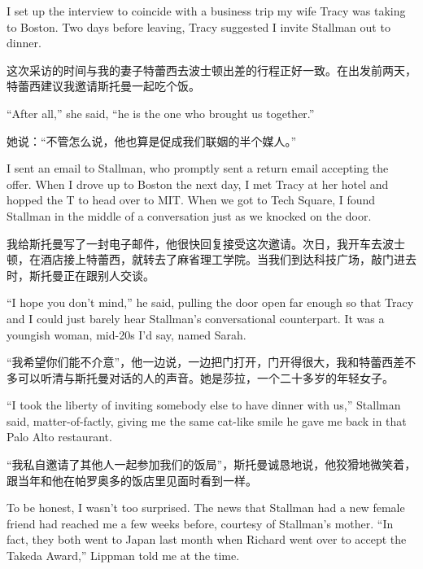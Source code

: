 \ifdefined\eng
I set up the interview to coincide with a business trip my wife Tracy was taking to Boston. Two days before leaving, Tracy suggested I invite Stallman out to dinner.
\fi

\ifdefined\chs
这次采访的时间与我的妻子特蕾西去波士顿出差的行程正好一致。在出发前两天，特蕾西建议我邀请斯托曼一起吃个饭。
\fi

\ifdefined\eng
``After all,'' she said, ``he is the one who brought us together.''
\fi

\ifdefined\chs
她说：``不管怎么说，他也算是促成我们联姻的半个媒人。''
\fi

\ifdefined\eng
I sent an email to Stallman, who promptly sent a return email accepting the offer. When I drove up to Boston the next day, I met Tracy at her hotel and hopped the T to head over to MIT. When we got to Tech Square, I found Stallman in the middle of a conversation just as we knocked on the door.
\fi

\ifdefined\chs
我给斯托曼写了一封电子邮件，他很快回复接受这次邀请。次日，我开车去波士顿，在酒店接上特蕾西，就转去了麻省理工学院。当我们到达科技广场，敲门进去时，斯托曼正在跟别人交谈。
\fi

\ifdefined\eng
``I hope you don't mind,'' he said, pulling the door open far enough so that Tracy and I could just barely hear Stallman's conversational counterpart. It was a youngish woman, mid-20s I'd say, named Sarah.
\fi

\ifdefined\chs
``我希望你们能不介意''，他一边说，一边把门打开，门开得很大，我和特蕾西差不多可以听清与斯托曼对话的人的声音。她是莎拉，一个二十多岁的年轻女子。
\fi

\ifdefined\eng
``I took the liberty of inviting somebody else to have dinner with us,'' Stallman said, matter-of-factly, giving me the same cat-like smile he gave me back in that Palo Alto restaurant.
\fi

\ifdefined\chs
``我私自邀请了其他人一起参加我们的饭局''，斯托曼诚恳地说，他狡猾地微笑着，跟当年和他在帕罗奥多的饭店里见面时看到一样。
\fi

\ifdefined\eng
To be honest, I wasn't too surprised. The news that Stallman had a new female friend had reached me a few weeks before, courtesy of Stallman's mother. ``In fact, they both went to Japan last month when Richard went over to accept the Takeda Award,'' Lippman told me at the time.
\fi

